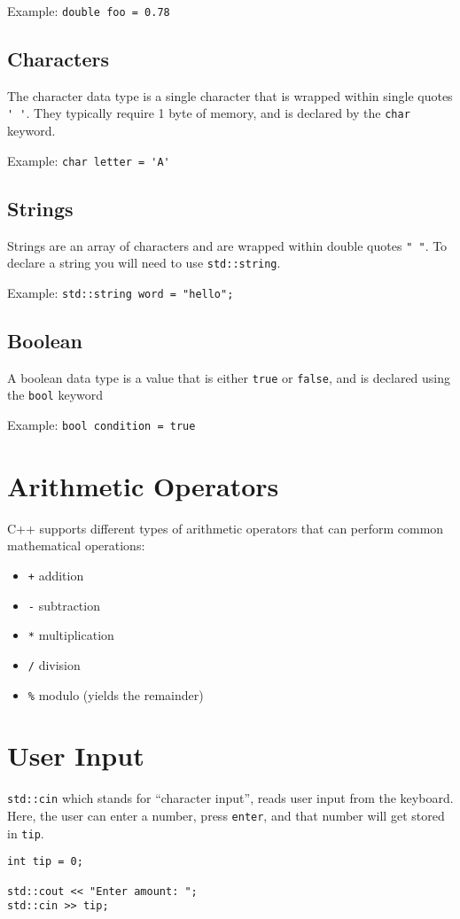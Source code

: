 \noindent Example: \verb!double foo = 0.78!

\subsection{Characters}
\par The character data type is a single character that is wrapped within single quotes \verb!' '!. They typically 
require 1 byte of memory, and is declared by the \verb!char! keyword. 

\noindent Example: \verb!char letter = 'A'!

\subsection{Strings}
\par Strings are an array of characters and are wrapped within double quotes \verb!" "!. To declare a string 
you will need to use \verb!std::string!.

\noindent Example: \verb!std::string word = "hello";!

\subsection{Boolean}
\par A boolean data type is a value that is either \verb!true! or \verb!false!, and is declared using the \verb!bool! keyword 

\noindent Example: \verb!bool condition = true!

\section{Arithmetic Operators}
\par C++ supports different types of arithmetic operators that can perform common mathematical operations:

\begin{itemize}
    \item \verb!+! addition
    \item \verb!-! subtraction
    \item \verb!*! multiplication
    \item \verb!/! division
    \item \verb!%! modulo (yields the remainder)
\end{itemize}

\section{User Input}
\verb!std::cin! which stands for “character input”, reads user input from the keyboard. Here, the user can enter 
a number, press \verb!enter!, and that number will get stored in \verb!tip!.
\begin{verbatim}
int tip = 0;
 
std::cout << "Enter amount: ";
std::cin >> tip;
\end{verbatim}

